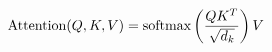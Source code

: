 \documentclass[preview]{standalone}
\begin{document}
\begin{align*}
\special{dvisvgm:raw <g id='unique000'>}\text{Attention}(Q,K,V) = \text{softmax}\left(\frac{QK^T}{\sqrt{d_k}}\right)V\special{dvisvgm:raw </g>}
\end{align*}
\end{document}
